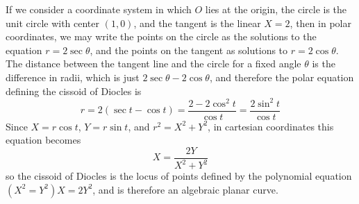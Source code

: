 \begin{example}
    If we consider a coordinate system in which $O$ lies at the origin, the circle is the unit circle with center $(1,0)$, and the tangent is the linear $X = 2$, then in polar coordinates, we may write the points on the circle as the solutions to the equation $r = 2 \sec \theta$, and the points on the tangent as solutions to $r = 2 \cos \theta$. The distance between the tangent line and the circle for a fixed angle $\theta$ is the difference in radii, which is just $2 \sec \theta - 2 \cos \theta$, and therefore the polar equation defining the cissoid of Diocles is
    \[ r = 2(\sec t - \cos t) = \frac{2 - 2\cos^2 t}{\cos t} = \frac{2 \sin^2 t}{\cos t}\]
    Since $X = r \cos t$, $Y = r \sin t$, and $r^2 = X^2 + Y^2$, in cartesian coordinates this equation becomes
    \[ X = \frac{2Y}{X^2 + Y^2} \]
    so the cissoid of Diocles is the locus of points defined by the polynomial equation $(X^2 = Y^2) X = 2Y^2$, and is therefore an algebraic planar curve.
\end{example}

